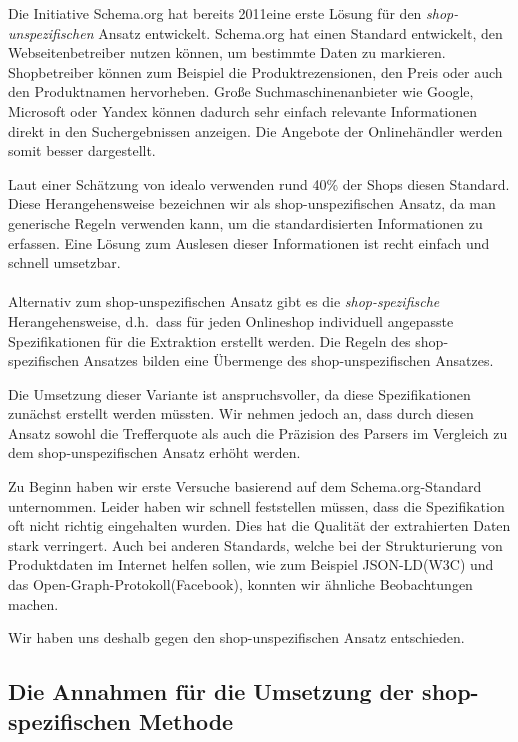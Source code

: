 Die Initiative Schema.org hat bereits 2011\footnotemark eine erste Lösung für den \textit{shop-unspezifischen} Ansatz
entwickelt.
Schema.org hat einen Standard entwickelt, den Webseitenbetreiber nutzen können, um bestimmte Daten zu markieren.
Shopbetreiber können zum Beispiel die Produktrezensionen, den Preis oder auch den Produktnamen hervorheben.
Große Suchmaschinenanbieter wie Google, Microsoft oder Yandex können dadurch sehr einfach relevante Informationen
direkt in den Suchergebnissen anzeigen.
Die Angebote der Onlinehändler werden somit besser dargestellt.

Laut einer Schätzung von idealo verwenden rund 40\% der Shops diesen Standard.
Diese Herangehensweise bezeichnen wir als shop-unspezifischen Ansatz, da man generische Regeln verwenden kann,
um die standardisierten Informationen zu erfassen.
Eine Lösung zum Auslesen dieser Informationen ist recht einfach und schnell umsetzbar.
\\
\\
Alternativ zum shop-unspezifischen Ansatz gibt es die \textit{shop-spezifische} Herangehensweise, d.h.\ dass für jeden
Onlineshop individuell angepasste Spezifikationen für die Extraktion erstellt werden.
Die Regeln des shop-spezifischen Ansatzes bilden eine Übermenge des shop-unspezifischen Ansatzes.

Die Umsetzung dieser Variante ist anspruchsvoller, da diese Spezifikationen zunächst erstellt werden müssten.
Wir nehmen jedoch an, dass durch diesen Ansatz sowohl die Trefferquote als auch die Präzision des Parsers
im Vergleich zu dem shop-unspezifischen Ansatz erhöht werden.

Zu Beginn haben wir erste Versuche basierend auf dem Schema.org-Standard unternommen.
Leider haben wir schnell feststellen müssen, dass die Spezifikation oft nicht richtig eingehalten wurden.
Dies hat die Qualität der extrahierten Daten stark verringert.
Auch bei anderen Standards, welche bei der Strukturierung von Produktdaten im Internet helfen sollen, wie zum Beispiel
JSON-LD\footnotemark (W3C) und das Open-Graph-Protokoll\footnotemark (Facebook), konnten wir ähnliche Beobachtungen
machen.

Wir haben uns deshalb gegen den shop-unspezifischen Ansatz entschieden.

\subsection{Die Annahmen für die Umsetzung der shop-spezifischen Methode}
\label{subsec:annahmen}

